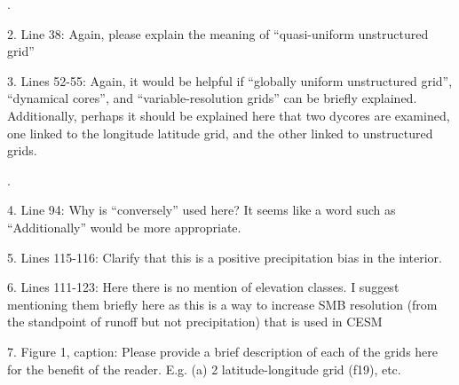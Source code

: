 \documentclass[12pt,oneside,a4paper]{article}%
\begin{document}
{\color{blue}{We agree that this is confusing and have added a sentence describing the different grids/dycores in more detail, before talking about their SMB performance.}}. \newline

2. Line 38: Again, please explain the meaning of “quasi-uniform unstructured grid”  \newline

{\color{blue}{See above.}} \newline

3. Lines 52-55: Again, it would be helpful if “globally uniform unstructured grid”, “dynamical cores”, and “variable-resolution grids” can be briefly explained. Additionally, perhaps it should be explained here that two dycores are examined, one linked to the longitude latitude grid, and the other linked to unstructured grids.  \newline

{\color{blue}{Added clarification for the meaning of quasi-uniform and variable-resolution. Decided against getting into the specifics of which dycore uses which grid, as this becomes apparent later on in the introduction}}. \newline

4. Line 94: Why is “conversely” used here? It seems like a word such as “Additionally” would be more appropriate.  \newline

{\color{blue}{Sentence has been reworded.}} \newline

5. Lines 115-116: Clarify that this is a positive precipitation bias in the interior.  \newline

{\color{blue}{Done.}} \newline

6. Lines 111-123: Here there is no mention of elevation classes. I suggest mentioning them briefly here as this is a way to increase SMB resolution (from the standpoint of runoff but not precipitation) that is used in CESM  \newline

{\color{blue}{We agree that the idea of ECs should be introduced here, and have added a sentence.}} \newline

7. Figure 1, caption: Please provide a brief description of each of the grids here for the benefit of the reader. E.g. (a) 2 latitude-longitude grid (f19), etc.  \newline
\end{document}
